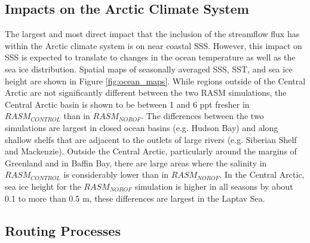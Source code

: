 \documentclass[jgrga, draft]{agutex}
\begin{document}
\begin{article}
\begin{itemize}[leftmargin=+.5in]
\begin{itemize}[leftmargin=+.5in]
\subsection{Impacts on the Arctic Climate System}
The largest and most direct impact that the inclusion of the streamflow flux has within the Arctic climate system is on near coastal SSS.
However, this impact on SSS is expected to translate to changes in the ocean temperature as well as the sea ice distribution.
Spatial maps of seasonally averaged SSS, SST, and sea ice height are shown in Figure \ref{fig:ocean_maps}.
While regions outside of the Central Arctic are not significantly different between the two RASM simulations, the Central Arctic basin is shown to be between 1 and 6 ppt fresher in $RASM_{CONTROL}$ than in $RASM_{NOROF}$.
The differences between the two simulations are largest in closed ocean basins (e.g. Hudson Bay) and along shallow shelfs that are adjacent to the outlets of large rivers (e.g. Siberian Shelf and Mackenzie).
Outside the Central Arctic, particularly around the margins of Greenland and in Baffin Bay, there are large areas where the salinity in $RASM_{CONTROL}$ is considerably lower than in $RASM_{NOROF}$.
In the Central Arctic, sea ice height for the $RASM_{NOROF}$ simulation is higher in all seasons by about 0.1 to more than 0.5 m, these differences are largest in the Laptav Sea.

\subsection{Routing Processes}



\end{itemize}
\end{itemize}
\end{article}
\end{document}

